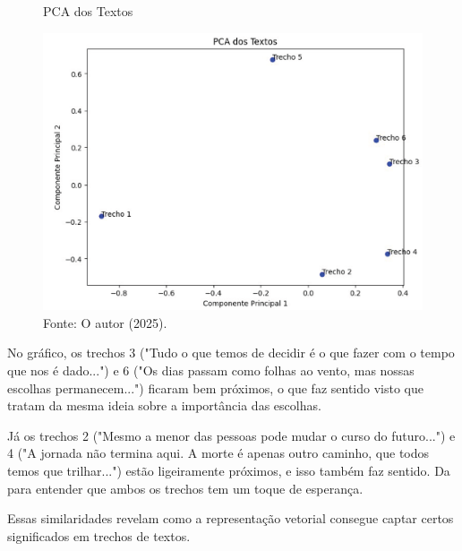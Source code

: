 \begin{figure}[H]
\centering
\caption{PCA dos Textos}
\includegraphics[width=1\linewidth]{apendices/fig/IAA015_3.png}
\caption*{Fonte: O autor (2025).}
\end{figure}

No gráfico, os trechos 3 ("Tudo o que temos de decidir é o que fazer com o tempo que nos é dado...") e 6 ("Os dias passam como folhas ao vento, mas nossas escolhas permanecem...") ficaram bem próximos, o que faz sentido visto que tratam da mesma ideia sobre a importância das escolhas.

Já os trechos 2 ("Mesmo a menor das pessoas pode mudar o curso do futuro...") e 4 ("A jornada não termina aqui. A morte é apenas outro caminho, que todos temos que trilhar...") estão ligeiramente próximos, e isso também faz sentido. Da para entender que ambos os trechos tem um toque de esperança.

Essas similaridades revelam como a representação vetorial consegue captar certos significados em trechos de textos.